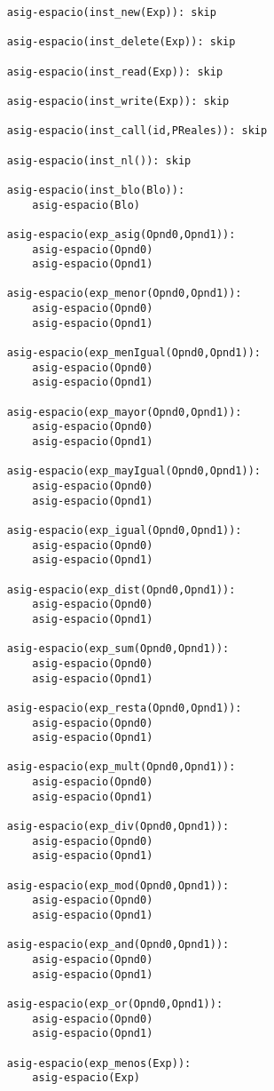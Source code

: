 \begin{lstlisting}
    asig-espacio(inst_new(Exp)): skip

    asig-espacio(inst_delete(Exp)): skip

    asig-espacio(inst_read(Exp)): skip

    asig-espacio(inst_write(Exp)): skip

    asig-espacio(inst_call(id,PReales)): skip

    asig-espacio(inst_nl()): skip

    asig-espacio(inst_blo(Blo)):
        asig-espacio(Blo)

    asig-espacio(exp_asig(Opnd0,Opnd1)):
        asig-espacio(Opnd0)
        asig-espacio(Opnd1)

    asig-espacio(exp_menor(Opnd0,Opnd1)):
        asig-espacio(Opnd0)
        asig-espacio(Opnd1)

    asig-espacio(exp_menIgual(Opnd0,Opnd1)):
        asig-espacio(Opnd0)
        asig-espacio(Opnd1)

    asig-espacio(exp_mayor(Opnd0,Opnd1)):
        asig-espacio(Opnd0)
        asig-espacio(Opnd1)

    asig-espacio(exp_mayIgual(Opnd0,Opnd1)):
        asig-espacio(Opnd0)
        asig-espacio(Opnd1)

    asig-espacio(exp_igual(Opnd0,Opnd1)):
        asig-espacio(Opnd0)
        asig-espacio(Opnd1)

    asig-espacio(exp_dist(Opnd0,Opnd1)):
        asig-espacio(Opnd0)
        asig-espacio(Opnd1)

    asig-espacio(exp_sum(Opnd0,Opnd1)):
        asig-espacio(Opnd0)
        asig-espacio(Opnd1)

    asig-espacio(exp_resta(Opnd0,Opnd1)):
        asig-espacio(Opnd0)
        asig-espacio(Opnd1)

    asig-espacio(exp_mult(Opnd0,Opnd1)):
        asig-espacio(Opnd0)
        asig-espacio(Opnd1)

    asig-espacio(exp_div(Opnd0,Opnd1)):
        asig-espacio(Opnd0)
        asig-espacio(Opnd1)

    asig-espacio(exp_mod(Opnd0,Opnd1)):
        asig-espacio(Opnd0)
        asig-espacio(Opnd1)

    asig-espacio(exp_and(Opnd0,Opnd1)):
        asig-espacio(Opnd0)
        asig-espacio(Opnd1)

    asig-espacio(exp_or(Opnd0,Opnd1)):
        asig-espacio(Opnd0)
        asig-espacio(Opnd1)

    asig-espacio(exp_menos(Exp)):
        asig-espacio(Exp)


\end{lstlisting}
